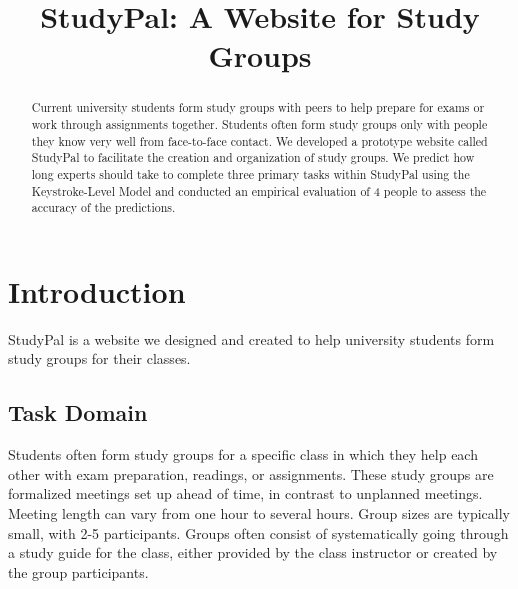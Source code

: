 \documentclass[conference]{IEEEtran}
\begin{document}
\title{StudyPal: A Website for Study Groups}

\author{
\and
{}
}


\maketitle


\begin{abstract}
Current university students form study groups with peers to help prepare for exams or work through assignments together.
Students often form study groups only with people they know very well from face-to-face contact.
We developed a prototype website called StudyPal to facilitate the creation and organization of study groups.
We predict how long experts should take to complete three primary tasks within StudyPal using the Keystroke-Level Model and conducted an empirical evaluation of 4 people to assess the accuracy of the predictions.
\end{abstract}

\IEEEpeerreviewmaketitle



\section{Introduction}
StudyPal is a website we designed and created to help university students form study groups for their classes.


\subsection{Task Domain}
Students often form study groups for a specific class in which they help each other with exam preparation, readings, or assignments.
These study groups are formalized meetings set up ahead of time, in contrast to unplanned meetings.
Meeting length can vary from one hour to several hours.
Group sizes are typically small, with 2-5 participants.
Groups often consist of systematically going through a study guide for the class, either provided by the class instructor or created by the group participants.
\end{document}
